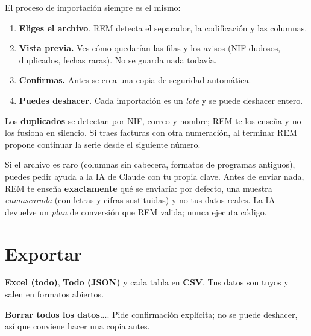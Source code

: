 El proceso de importación siempre es el mismo:
\begin{enumerate}
\item \textbf{Eliges el archivo}. REM detecta el separador, la codificación y las columnas.
\item \textbf{Vista previa.} Ves cómo quedarían las filas y los avisos (NIF dudosos, duplicados, fechas raras). No se guarda nada todavía.
\item \textbf{Confirmas.} Antes se crea una copia de seguridad automática.
\item \textbf{Puedes deshacer.} Cada importación es un \emph{lote} y se puede deshacer entero.
\end{enumerate}
Los \textbf{duplicados} se detectan por NIF, correo y nombre; REM te los enseña y no los fusiona en silencio. Si traes facturas con otra numeración, al terminar REM propone continuar la serie desde el siguiente número.

\begin{aibox}
Si el archivo es raro (columnas sin cabecera, formatos de programas antiguos), puedes pedir ayuda a la IA de Claude con tu propia clave. Antes de enviar nada, REM te enseña \textbf{exactamente} qué se enviaría: por defecto, una muestra \emph{enmascarada} (con letras y cifras sustituidas) y no tus datos reales. La IA devuelve un \emph{plan} de conversión que REM valida; nunca ejecuta código.
\end{aibox}

\section{Exportar}
\begin{leyenda}
\item[\mk{5}] \textbf{Excel (todo)}, \textbf{Todo (JSON)} y cada tabla en \textbf{CSV}. Tus datos son tuyos y salen en formatos abiertos.
\item[\mk{6}] \textbf{Borrar todos los datos…}. Pide confirmación explícita; no se puede deshacer, así que conviene hacer una copia antes.
\end{leyenda}
